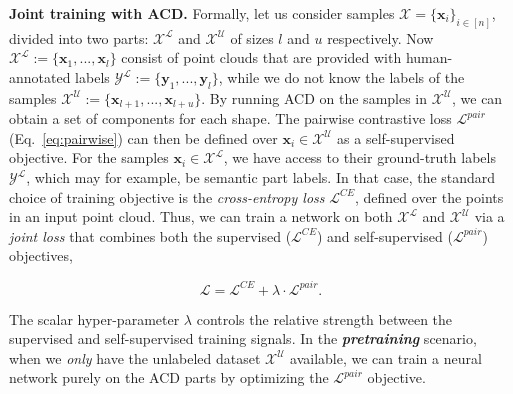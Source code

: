 \vspace{2mm}
\noindent
\textbf{Joint training with ACD.}
Formally, let us consider samples $\mathcal{X} = \{ \mathbf{x}_i \}_{i \in [n]}$, 
divided into two parts: $\mathcal{X^L}$ and  $\mathcal{X^U}$ of sizes $l$ and $u$ 
respectively. Now $\mathcal{X^L} := \{\mathbf{x}_1, ... , \mathbf{x}_l  \}$ consist 
of point clouds that are provided with human-annotated 
labels $\mathcal{Y^L} := \{\mathbf{y}_1, ... , \mathbf{y}_l  \}$, 
while we do not know the labels of the samples $\mathcal{X^U} := \{\mathbf{x}_{l+1},
... , \mathbf{x}_{l+u}  \}$.
By running ACD on the samples in $\mathcal{X^U}$, we can obtain a 
set of components for each shape. The pairwise contrastive loss 
$\mathcal{L}^{pair}$ (Eq.~\ref{eq:pairwise}) can then be defined over $\mathbf{x}_i \in \mathcal{X^U}$ as a self-supervised objective.
%
For the samples $\mathbf{x}_i \in \mathcal{X^L}$, we have access to
their ground-truth labels $\mathcal{Y^L}$, which may for example, 
be semantic part labels. In that case, the standard choice of 
training objective is the \textit{cross-entropy loss} $\mathcal{L}^{CE}$, 
defined over the points in an input point cloud. 
Thus, we can train a network on both $\mathcal{X^L}$ and 
$\mathcal{X^U}$ via a \textit{joint loss} that combines both 
the supervised ($\mathcal{L}^{CE}$) and self-supervised ($\mathcal{L}^{pair}$)
objectives,

\begin{equation}
    \mathcal{L} = \mathcal{L}^{CE} + \lambda \cdot \mathcal{L}^{pair}.
    \label{eq:joint}
\end{equation}

The scalar hyper-parameter $\lambda$ controls the relative 
strength between the supervised and self-supervised training 
signals. 
%
In the \textbf{\textit{pretraining}} scenario, when we 
\textit{only} have the unlabeled dataset $\mathcal{X^U}$ available,
we can train a neural network purely on the ACD parts by 
optimizing the $\mathcal{L}^{pair}$ objective.





